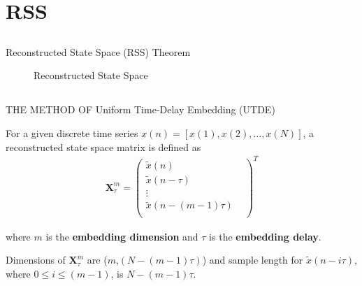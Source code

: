
\section{RSS}

\subsection{}
{

\begin{frame}{Reconstructed State Space (RSS) Theorem}
    \begin{figure}
	\caption{Reconstructed State Space} 
   \end{figure}
	
\end{frame}
}


\subsection{}
{

\begin{frame}{THE METHOD OF Uniform Time-Delay Embedding (UTDE)}

For a given discrete time series $x(n) = [x(1) , x(2), \dots, x(N)]$,
a reconstructed state space matrix is defined as 
\begin{eqnarray*}
 \mathbf{X}^{m}_{\tau}
  = \begin{pmatrix} \nonumber
      \tilde{x}(n)  & \\
      \tilde{x}(n-\tau)  & \\
      \vdots  &  \\
      \tilde{x}(n-(m-1)\tau) & \\
      \end{pmatrix}^T
\end{eqnarray*}

where $m$ is the \textbf{embedding dimension}  and  $\tau$ is the \textbf{ embedding delay}.

Dimensions of $\mathbf{X}^{m}_{\tau}$ are ($m$,$(N-(m-1)\tau)$) and 
sample length for $\tilde{x}(n-i\tau)$, where $0 \leq i \leq (m-1)$, is $N-(m-1)\tau$.




\end{frame}
}


